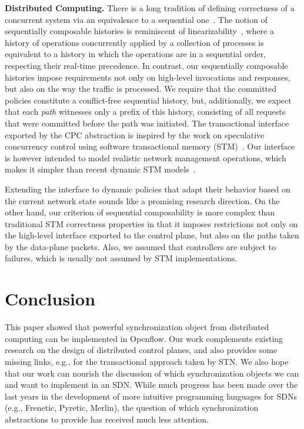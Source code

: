 \documentclass[conference]{sigcomm-alternate}
\begin{document}
\noindent\textbf{Distributed Computing.}
There is a long tradition of defining correctness of a concurrent system via
an equivalence to a sequential one~\cite{Pap79-serial,Lam79,HW90}.  The notion
of sequentially composable histories is reminiscent of
linearizability~\cite{HW90}, where a history of operations concurrently
applied by a collection of processes is equivalent to a history in which the
operations are in a sequential order, respecting their real-time precedence.
In contrast, our sequentially composable histories impose requirements not
only on high-level invocations and responses, but also on the way the traffic
is processed. We require that the committed policies constitute a
conflict-free sequential history, but, additionally,  we expect that each
\emph{path} witnesses only a prefix of this history, consisting of all
requests that were committed before the path was initiated.
%
The transactional interface exported by the CPC abstraction is inspired by the
work on speculative concurrency control using software transactional memory
(STM)~\cite{stm-st95}.
Our interface is however intended to model realistic network
management operations, which makes it simpler than recent
dynamic STM models~\cite{dstm}.

Extending the interface to dynamic policies that adapt their behavior based on
the current network state sounds like a promising research direction.  On the
other hand, our criterion of sequential composability is more complex than
traditional STM correctness properties in that it imposes restrictions not only
on the high-level interface exported to the control plane, but also on the
paths taken by the data-plane packets.
Also, we assumed that controllers are subject to failures, which is usually not
assumed by STM implementations.


\section{Conclusion}\label{sec:conclusion}

This paper showed that powerful synchronization object
from distributed computing can be implemented in Openflow.
Our work complements existing research on the design of
distributed control planes, and also provides some missing links,
e.g., for the transactional approach taken by STN.
We also hope that our work can nourish the discussion of
which synchronization objects we can and want to implement
in an SDN. While much progress has been made over the
last years in the development of more intuitive programming
languages for SDNs (e.g., Frenetic, Pyretic, Merlin), the
question of which synchronization abstractions to provide
has received much less attention.
\end{document}
